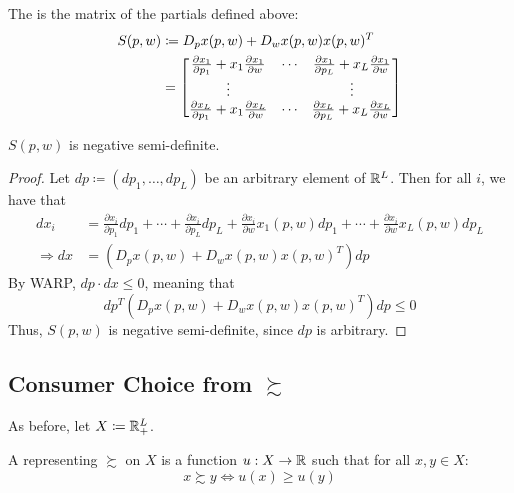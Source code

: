 \documentclass[12pt]{article}
\begin{document}
\begin{definition}
	The  is the matrix of the partials defined above:
	\begin{align*}
		S(p,w) &\coloneqq D_p x(p,w) + D_w x(p,w) x(p,w)^T \\
		&= \begin{bmatrix}\frac{\partial x_1}{\partial p_1} + x_1 \frac{\partial x_1}{\partial w} & \cdots & \frac{\partial x_1}{\partial p_L} + x_L \frac{\partial x_1}{\partial w} \\ \vdots && \vdots \\\frac{\partial x_L}{\partial p_1} + x_1 \frac{\partial x_L}{\partial w} & \cdots & \frac{\partial x_L}{\partial p_L} + x_L \frac{\partial x_L}{\partial w} \end{bmatrix}
	\end{align*}
\end{definition}

\begin{proposition}\label{prop:slutsky_nsd}
	$S(p,w)$ is negative semi-definite.
\end{proposition}
\begin{proof}
	Let $dp \coloneqq (dp_1,\dots,dp_L)$ be an arbitrary element of $\mathbb{R}^L$. Then for all $i$, we have that
	\begin{align*}
		dx_i &= \frac{\partial x_i}{\partial p_1}dp_1 + \cdots + \frac{\partial x_i}{\partial p_L}dp_L + \frac{\partial x_i}{\partial w}x_1(p,w)dp_1 + \cdots + \frac{\partial x_i}{\partial w}x_L(p,w)dp_L \\
		\Longrightarrow dx &= (D_px(p,w) + D_wx(p,w) x(p,w)^T) dp
	\end{align*}
	By WARP, $dp \cdot dx \le 0$, meaning that
	\[
	dp^T (D_px(p,w) + D_wx(p,w) x(p,w)^T) dp \le 0
	\]
	Thus, $S(p,w)$ is negative semi-definite, since $dp$ is arbitrary.
\end{proof}


\subsection{Consumer Choice from $\succsim$}

\begin{assumption}
	As before, let $X \coloneqq \mathbb{R}^L_+$. 
\end{assumption}
\begin{definition}
	A  representing $\succsim$ on $X$ is a function $u: X \to \mathbb{R}$ such that for all $x,y \in X$:
	\[
	x \succsim y \Longleftrightarrow u(x) \ge u(y)
	\]
\end{definition}
\end{document}
